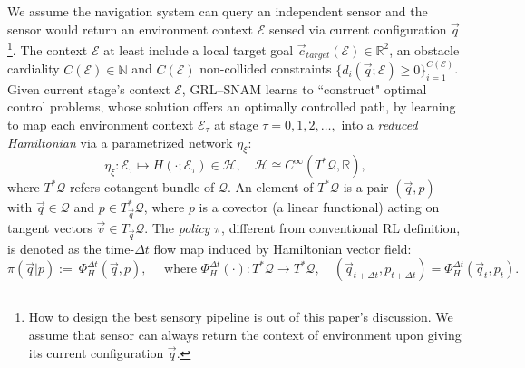 { We assume the navigation system can query an independent sensor and the sensor would return an environment context $\mathcal{E}$ sensed via current configuration} $\vec{q}$\footnote{How to design the best sensory pipeline is out of this paper's discussion. We assume that sensor can always return the context of environment upon giving {its current} configuration $\vec{q}$.}. The context $\mathcal{E}$ at least include a local target goal $\vec{c}_{target}(\mathcal{E})\in \mathbb{R}^{2}$,  an obstacle cardiality $C(\mathcal{E})\in \mathbb{N}$ and $C(\mathcal{E})$ non-collided constraints $\{d_i(\vec{q};\mathcal{E})\geq 0\}_{i=1}^{C(\mathcal{E})}$. Given current stage's context $\mathcal{E}$, GRL--SNAM learns to ``construct" optimal control problems, whose solution offers an optimally controlled path, by learning to map each environment context $\mathcal E_\tau$ at stage $\tau=0,1,2,\ldots,$ into a \textit{reduced Hamiltonian} via a parametrized network $\eta_{\xi}$:
\[
\eta_{\xi}:\mathcal E_\tau \longmapsto H(\cdot;\mathcal E_\tau)\in \mathscr H,
\quad 
\mathscr H\cong C^{\infty}(T^{*}\mathcal{Q},\mathbb{R}),
\]
where $T^{*}\mathcal{Q}$ refers cotangent bundle of $\mathcal{Q}$. An element of $T^{*}\mathcal{Q}$ is a pair $(\vec{q},p)$ with $\vec{q}\in \mathcal{Q}$ and $p\in T^{*}_{\vec{q}}\mathcal{Q}$, where $p$ is a covector (a linear functional)
acting on tangent vectors $\vec{v}\in T_{\vec{q}}\mathcal{Q}$. The \emph{policy} $\pi$, different from conventional RL definition, is denoted as the time-$\Delta t$ flow map induced by Hamiltonian vector field:
\begin{equation}
\pi(\vec{q}|p):=\ \Phi^{\Delta t}_{H}(\vec{q},p),\quad \text{ where } \Phi^{\Delta t}_{H}(\cdot):T^*\mathcal{Q}\to T^*
\mathcal{Q},
\quad (\vec{q}_{t+\Delta t},p_{t+\Delta t})=\Phi^{\Delta t}_{H}(\vec{q}_{t},p_{t}).
\end{equation}


